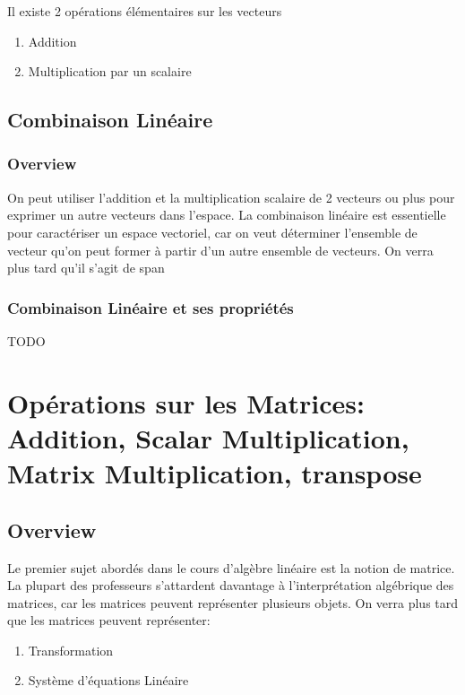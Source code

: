\documentclass{article}
\begin{document}
Il existe 2 opérations élémentaires sur les vecteurs
\begin{enumerate}
    \item Addition
    \item Multiplication par un scalaire
\end{enumerate}

\subsection{Combinaison Linéaire}%
\label{sub:Combinaison Linéaire}

\subsubsection{Overview}%
\label{ssub:Overview}

On peut utiliser l'addition et la multiplication scalaire de 2 vecteurs ou plus
pour exprimer un autre vecteurs dans l'espace. La combinaison linéaire est
essentielle pour caractériser un espace vectoriel, car on veut déterminer
l'ensemble de vecteur qu'on peut former à partir d'un autre ensemble de
vecteurs. On verra plus tard qu'il s'agit de span

\subsubsection{Combinaison Linéaire et ses propriétés}%
\label{ssub:Combinaison Linéaire et ses propriétés}

\begin{definition}
    TODO
\end{definition}

\section{Opérations sur les Matrices: Addition, Scalar Multiplication,
Matrix Multiplication, transpose}

\subsection{Overview}%
\label{sub:Overview}

Le premier sujet abordés dans le cours d'algèbre linéaire est la notion
de matrice. La plupart des professeurs s'attardent davantage à l'interprétation
algébrique des matrices, car les matrices peuvent représenter plusieurs objets.
On verra plus tard que les matrices peuvent représenter:
\begin{enumerate}
    \item Transformation
    \item Système d'équations Linéaire
\end{enumerate}
\end{document}
